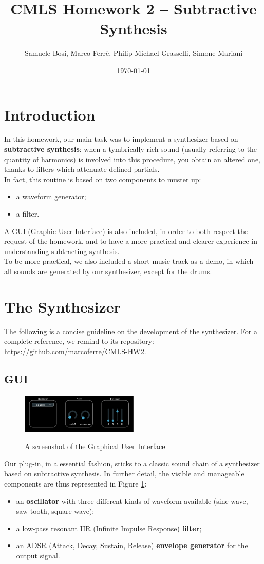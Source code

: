 \documentclass[11pt]{article}
\author{Samuele Bosi, Marco Ferrè, Philip Michael Grasselli, Simone Mariani}
\title{\textbf{CMLS Homework 2 – Subtractive Synthesis}}
\date{\today}
\begin{document}
\maketitle
\tableofcontents

\section{Introduction}
In this homework, our main task was to implement a synthesizer based on \textbf{subtractive synthesis}: when a tymbrically rich sound (usually referring to the quantity of harmonics) is involved into this procedure, you obtain an altered one, thanks to filters which attenuate defined partials. \\
In fact, this routine is based on two components to muster up:
\begin{itemize}
\item a waveform generator;
\item a filter.
\end{itemize}
A GUI (Graphic User Interface) is also included, in order to both respect the request of the homework, and to have a more practical and clearer experience in understanding subtracting synthesis.\\
To be more practical, we also included a short music track as a demo, in which all sounds are generated by our synthesizer, except for the drums.

\section{The Synthesizer}
The following is a concise guideline on the development of the synthesizer. For a complete reference, we remind to its repository: \url{https://github.com/marcoferre/CMLS-HW2}.

\subsection{GUI}
\begin{figure}
\centering
\includegraphics[width=0.5\textwidth]{GUI.png}
\label{fig:GUI}
\caption{A screenshot of the Graphical User Interface}
\end{figure}
Our plug-in, in a essential fashion, sticks to a classic sound chain of a synthesizer based on subtractive synthesis. In further detail, the visible and manageable components are thus represented in Figure \ref{fig:GUI}:
\begin{itemize}
\item an \textbf{oscillator} with three different kinds of waveform available (sine wave, saw-tooth, square wave);
\item a low-pass resonant IIR (Infinite Impulse Response) \textbf{filter};
\item an ADSR (Attack, Decay, Sustain, Release) \textbf{envelope generator} for the output signal.
\end{itemize}
\end{document}
